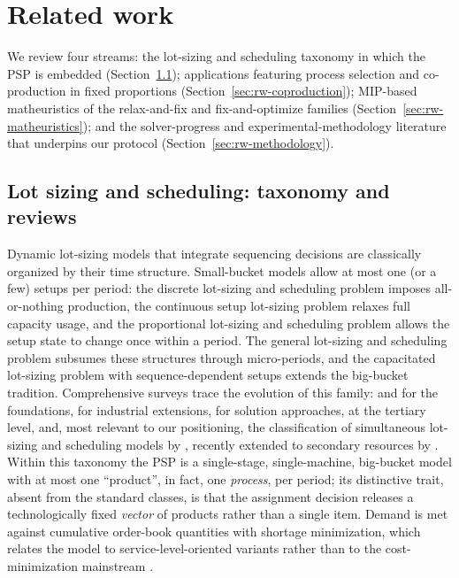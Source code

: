 \section{Related work}
\label{sec:related}

We review four streams: the lot-sizing and scheduling taxonomy in
which the PSP is embedded (Section~\ref{sec:rw-taxonomy}); applications
featuring process selection and co-production in fixed proportions
(Section~\ref{sec:rw-coproduction}); MIP-based matheuristics of the
relax-and-fix and fix-and-optimize families
(Section~\ref{sec:rw-matheuristics}); and the solver-progress and
experimental-methodology literature that underpins our protocol
(Section~\ref{sec:rw-methodology}).

\subsection{Lot sizing and scheduling: taxonomy and reviews}
\label{sec:rw-taxonomy}

Dynamic lot-sizing models that integrate sequencing decisions are
classically organized by their time structure. Small-bucket models
allow at most one (or a few) setups per period: the discrete
lot-sizing and scheduling problem \citep[DLSP;][]{fleischmann1990dlsp}
imposes all-or-nothing production, the continuous setup lot-sizing
problem \citep[CSLP;][]{karmarkar1985deterministic} relaxes full
capacity usage, and the proportional lot-sizing and scheduling problem
\citep[PLSP;][]{drexl1995proportional} allows the setup state to
change once within a period. The general lot-sizing and scheduling
problem \citep[GLSP;][]{fleischmann1997general} subsumes these
structures through micro-periods, and the capacitated lot-sizing
problem with sequence-dependent setups \citep{haase1996clsd} extends
the big-bucket tradition. Comprehensive surveys trace the evolution of
this family: \citet{drexl1997lotsizing} and
\citet{karimi2003capacitated} for the foundations,
\citet{jans2008modeling} for industrial extensions,
\citet{buschkuhl2010dynamic} for solution approaches,
\citet{glock2014tertiary} at the tertiary level, and, most relevant to
our positioning, the classification of simultaneous lot-sizing and
scheduling models by \citet{copil2017simultaneous}, recently extended
to secondary resources by \citet{worbelauer2019secondary}. Within this
taxonomy the PSP is a single-stage, single-machine, big-bucket model
with at most one ``product'', in fact, one \emph{process}, per
period; its distinctive trait, absent from the standard classes, is
that the assignment decision releases a technologically fixed
\emph{vector} of products rather than a single item. Demand is met
against cumulative order-book quantities with shortage minimization,
which relates the model to service-level-oriented variants rather than
to the cost-minimization mainstream \citep{pochet2006production}.

